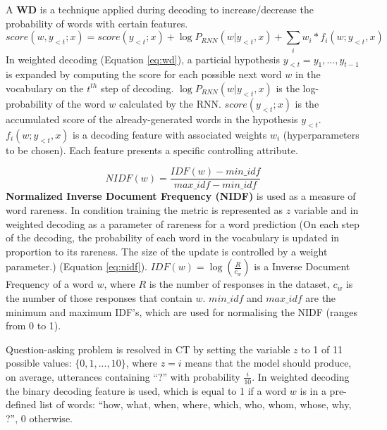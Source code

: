 A \textbf{WD} is a technique applied during decoding to increase/decrease the probability of words with certain features. 
\begin{equation} \label{eq:wd}
score(w, y_{<t}; x) = score(y_{<t}; x) + \log P_{RNN}(w|y_{<t}, x) + \sum_i w_i * f_i(w; y_{<t}, x)
\end{equation}
In weighted decoding (Equation \ref{eq:wd}), a particial hypothesis $y_{<t} = y_1, ..., y_{t-1}$ is expanded by computing the score for each possible next word $w$ in the vocabulary on the $t^{th}$ step of decoding. $\log P_{RNN}(w|y_{<t}, x)$ is the log-probability of the word $w$ calculated by the RNN. $score(y_{<t}; x)$ is the accumulated score of the already-generated words in the hypothesis $y_{<t}$. $f_i(w; y_{<t}, x)$ is a decoding feature with associated weights $w_i$ (hyperparameters to be chosen). Each feature presents a specific controlling attribute.

\begin{equation} \label{eq:nidf}
NIDF(w) = \frac{IDF(w) - min\_idf}{max\_idf - min\_idf}
\end{equation}
\textbf{Normalized Inverse Document Frequency (NIDF)} is used as a measure of word rareness. In condition training the metric is represented as $z$ variable and in weighted decoding as a parameter of rareness for a word prediction (On each step of the decoding, the probability of each word in the vocabulary is updated in proportion to its rareness. The size of the update is controlled by a weight parameter.) (Equation \ref{eq:nidf}). $IDF(w) = \log(\frac{R}{c_w})$ is a Inverse Document Frequency of a word $w$, where $R$ is the number of responses in the dataset, $c_w$ is the number of those responses that contain $w$. $min\_idf$ and $max\_idf$ are the minimum and maximum IDF's, which are used for normalising the NIDF (ranges from 0 to 1).

Question-asking problem is resolved in CT by setting the variable $z$ to 1 of 11 possible values: $\{0, 1, ..., 10\}$, where $z=i$ means that the model should produce, on average, utterances containing ``?'' with probability $\frac{i}{10}$. In weighted decoding the binary decoding feature is used, which is equal to 1 if a word $w$ is in a pre-defined list of words: ``how, what, when, where, which, who, whom, whose, why, ?'', 0 otherwise.

